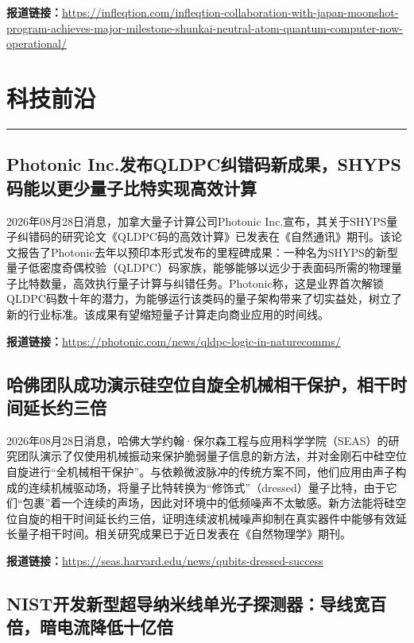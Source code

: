 \documentclass[12pt,a4paper]{ctexart}
\begin{document}
\noindent\textbf{报道链接：}\url{https://infleqtion.com/infleqtion-collaboration-with-japan-moonshot-program-achieves-major-milestone-shunkai-neutral-atom-quantum-computer-now-operational/}


\newpage
\section{科技前沿}
\vspace{-0.5em}
\noindent\rule{\linewidth}{1.5pt}

\subsection{ Photonic Inc.发布QLDPC纠错码新成果，SHYPS码能以更少量子比特实现高效计算 }

2026年08月28日消息，加拿大量子计算公司Photonic Inc.宣布，其关于SHYPS量子纠错码的研究论文《QLDPC码的高效计算》已发表在《自然通讯》期刊。该论文报告了Photonic去年以预印本形式发布的里程碑成果：一种名为SHYPS的新型量子低密度奇偶校验（QLDPC）码家族，能够能够以远少于表面码所需的物理量子比特数量，高效执行量子计算与纠错任务。Photonic称，这是业界首次解锁QLDPC码数十年的潜力，为能够运行该类码的量子架构带来了切实益处，树立了新的行业标准。该成果有望缩短量子计算走向商业应用的时间线。

\noindent\textbf{报道链接：}\url{https://photonic.com/news/qldpc-logic-in-naturecomms/}

\subsection{ 哈佛团队成功演示硅空位自旋全机械相干保护，相干时间延长约三倍 }

2026年08月28日消息，哈佛大学约翰·保尔森工程与应用科学学院（SEAS）的研究团队演示了仅使用机械振动来保护脆弱量子信息的新方法，并对金刚石中硅空位自旋进行“全机械相干保护”。与依赖微波脉冲的传统方案不同，他们应用由声子构成的连续机械驱动场，将量子比特转换为“修饰式”（dressed）量子比特，由于它们“包裹”着一个连续的声场，因此对环境中的低频噪声不太敏感。新方法能将硅空位自旋的相干时间延长约三倍，证明连续波机械噪声抑制在真实器件中能够有效延长量子相干时间。相关研究成果已于近日发表在《自然物理学》期刊。

\noindent\textbf{报道链接：}\url{https://seas.harvard.edu/news/qubits-dressed-success}

\subsection{ NIST开发新型超导纳米线单光子探测器：导线宽百倍，暗电流降低十亿倍 }
\end{document}
